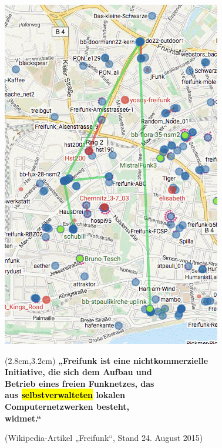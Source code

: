\documentclass[t]{beamer}
\begin{document}
\begin{frame}{}
    \begin{center}
        \includegraphics[width=.5\textwidth]{Bilder/backbone-2015-09-22}
    \end{center}
\end{frame}




\begin{frame}{}
    \begin{textblock*}{10cm}(2.8cm,3.2cm)
        \Large\bf
        „Freifunk ist eine nicht\-kommerzielle \\
        Initiative, die sich dem Aufbau und \\
        Betrieb eines freien Funknetzes, das \\
        aus \hl{\LARGE selbstverwalteten} lokalen \\
        Computer\-netzwerken besteht, \\
        widmet.“
    \end{textblock*}

    \vspace{7cm}
    \hspace{4.1cm}
    {\scriptsize(Wikipedia-Artikel „Freifunk“, Stand 24. August 2015)}
\end{frame}
\end{document}

